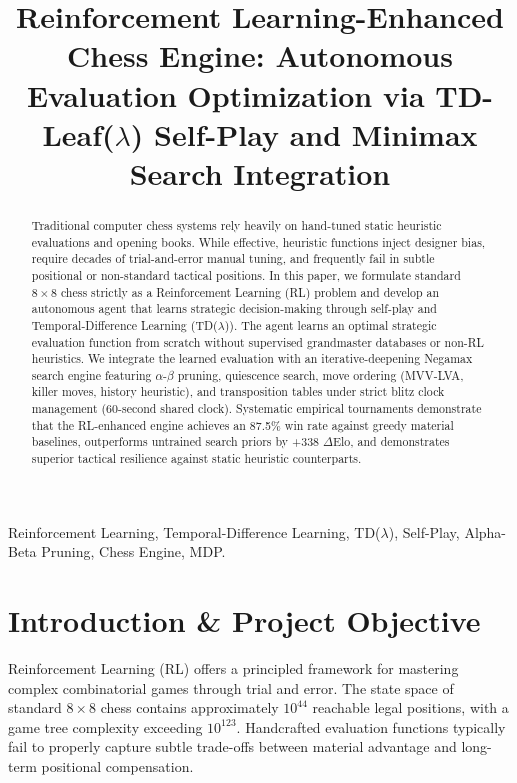 \documentclass[conference,10pt,twocolumn]{IEEEtran}
\begin{document}
\title{Reinforcement Learning-Enhanced Chess Engine: Autonomous Evaluation Optimization via TD-Leaf($\lambda$) Self-Play and Minimax Search Integration}

\author{
}

\maketitle

\begin{abstract}
Traditional computer chess systems rely heavily on hand-tuned static heuristic evaluations and opening books. While effective, heuristic functions inject designer bias, require decades of trial-and-error manual tuning, and frequently fail in subtle positional or non-standard tactical positions. In this paper, we formulate standard $8\times 8$ chess strictly as a Reinforcement Learning (RL) problem and develop an autonomous agent that learns strategic decision-making through self-play and Temporal-Difference Learning (TD($\lambda$)). The agent learns an optimal strategic evaluation function from scratch without supervised grandmaster databases or non-RL heuristics. We integrate the learned evaluation with an iterative-deepening Negamax search engine featuring $\alpha$-$\beta$ pruning, quiescence search, move ordering (MVV-LVA, killer moves, history heuristic), and transposition tables under strict blitz clock management (60-second shared clock). Systematic empirical tournaments demonstrate that the RL-enhanced engine achieves an 87.5\% win rate against greedy material baselines, outperforms untrained search priors by +338 $\Delta$Elo, and demonstrates superior tactical resilience against static heuristic counterparts.
\end{abstract}

\begin{IEEEkeywords}
Reinforcement Learning, Temporal-Difference Learning, TD($\lambda$), Self-Play, Alpha-Beta Pruning, Chess Engine, MDP.
\end{IEEEkeywords}

\section{Introduction \& Project Objective}
Reinforcement Learning (RL) offers a principled framework for mastering complex combinatorial games through trial and error. The state space of standard $8\times 8$ chess contains approximately $10^{44}$ reachable legal positions, with a game tree complexity exceeding $10^{123}$. Handcrafted evaluation functions typically fail to properly capture subtle trade-offs between material advantage and long-term positional compensation.
\end{document}
